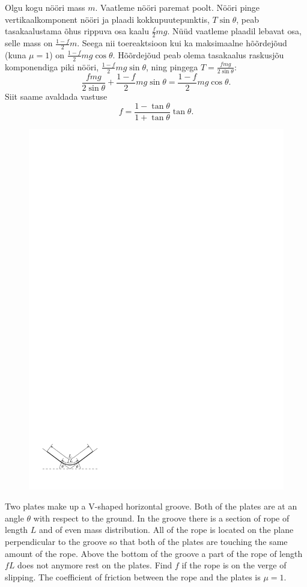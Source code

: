 {\ifSolution
Olgu kogu nööri mass $m$. Vaatleme nööri paremat poolt. Nööri pinge vertikaalkomponent nööri ja plaadi kokkupuutepunktis, $T \sin \theta$, peab tasakaalustama õhus rippuva osa kaalu $\frac{f}{2}mg$. Nüüd vaatleme plaadil lebavat osa, selle mass on $\frac{1-f}{2}m$. Seega nii toereaktsioon kui ka maksimaalne hõõrdejõud (kuna $\mu = 1$) on $\frac{1-f}{2}mg \cos \theta$. Hõõrdejõud peab olema tasakaalus raskusjõu komponendiga piki nööri, $\frac{1-f}{2}mg \sin \theta$, ning pingega $T=\frac{f m g}{2 \sin \theta}$: $$\frac{f m g}{2 \sin \theta} + \frac{1-f}{2}mg \sin \theta = \frac{1-f}{2}mg \cos \theta.$$
Siit saame avaldada vastuse $$f = \frac{1-\tan \theta}{1+\tan \theta} \tan \theta. $$
\fi


\ifEngStatement
\begin{figure}
\includegraphics[width=\linewidth]{2012-lahg-09-n88r_ipe}
\end{figure}
Two plates make up a V-shaped horizontal groove. Both of the plates are at an angle $\theta$ with respect to the ground. In the groove there is a section of rope of length $L$ and of even mass distribution. All of the rope is located on the plane perpendicular to the groove so that both of the plates are touching the same amount of the rope. Above the bottom of the groove a part of the rope of length $fL$ does not anymore rest on the plates. Find $f$ if the rope is on the verge of slipping. The coefficient of friction between the rope and the plates is $\mu = 1$.
\fi


}
